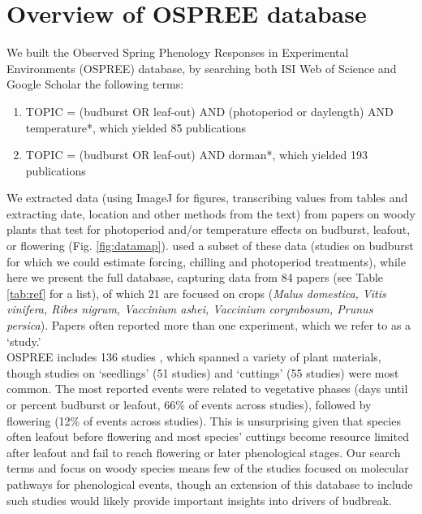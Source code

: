 \documentclass[11pt]{article}
\begin{document}
\section{Overview of OSPREE database}
We built the Observed Spring Phenology Responses in Experimental Environments (OSPREE) database, by searching both ISI Web of Science and Google Scholar  the following terms: 
\begin{enumerate}
\item TOPIC = (budburst OR leaf-out) AND (photoperiod or daylength) AND temperature*, which yielded 85 publications
\item TOPIC = (budburst OR leaf-out) AND dorman*, which yielded 193 publications
\end{enumerate}
We extracted data (using ImageJ for figures, transcribing values from tables and extracting date, location and other methods from the text) from papers on woody plants that test for photoperiod and/or temperature effects on budburst, leafout, or flowering (Fig. \ref{fig:datamap}). \citet{ettinger2020} used a subset of these data (studies on budburst for which we could estimate forcing, chilling and photoperiod treatments), while here we present the full database, capturing data from 84 papers (see Table \ref{tab:ref} for a list), of which 21 are focused on crops (\emph{Malus domestica, Vitis vinifera, Ribes nigrum, Vaccinium ashei, Vaccinium corymbosum, Prunus persica}). Papers often reported more than one experiment, which we refer to as a `study.' \\

OSPREE includes 136 studies \citep[with the earliest study was conducted in 1947,see][]{Lamb:1948aa}, which spanned a variety of plant materials, though studies on `seedlings' (51 studies) and `cuttings' (55 studies) were most common. The most reported events were related to vegetative phases (days until or percent budburst or leafout, 66\% of events across studies), followed by flowering (12\% of events across studies). This is unsurprising given that species often leafout before flowering and most species' cuttings become resource limited after leafout and fail to reach flowering or later phenological stages. Our search terms and focus on woody species means few of the studies focused on molecular pathways for phenological events, though an extension of this database to include such studies would likely provide important insights into drivers of budbreak. \\
\end{document}
